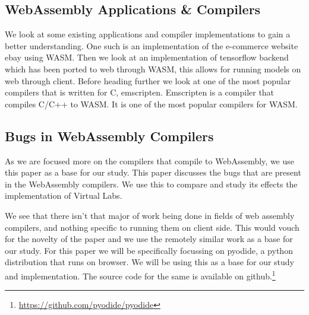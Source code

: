 \subsection*{WebAssembly Applications \& Compilers}
We look at some existing applications and compiler implementations to gain a better understanding. One such is an implementation of the e-commerce website ebay using WASM\cite{padmanabhan2020webassembly}. Then we look at an implementation of tensorflow backend which has been ported to web through WASM\cite{smilkov2020introducing}, this allows for running models on web through client. Before heading further we look at one of the most popular compilers that is written for C, emscripten\cite{zakai2011emscripten}. Emscripten is a compiler that compiles C/C++ to WASM. It is one of the most popular compilers for WASM.

\subsection*{Bugs in WebAssembly Compilers}
As we are focused more on the compilers that compile to WebAssembly, we use this paper as a base for our study\cite{bugsinwasm}. This paper discusses the bugs that are present in the WebAssembly compilers. We use this to compare and study its effects the implementation of Virtual Labs.

We see that there isn't that major of work being done in fields of web assembly compilers, and nothing specific to running them on client side. This would vouch for the novelty of the paper and we use the remotely similar work as a base for our study. For this paper we will be specifically focussing on pyodide, a python distribution that runs on browser\cite{pyodide}. We will be using this as a base for our study and implementation. The source code for the same is available on github.\footnote{\url{https://github.com/pyodide/pyodide}}
